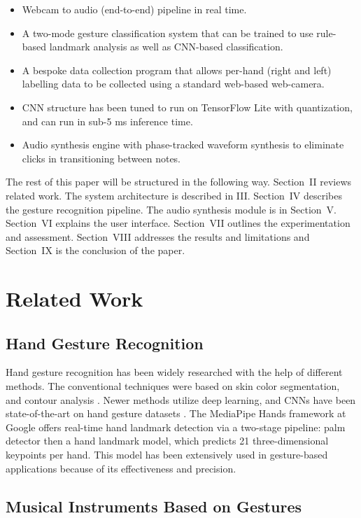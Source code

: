 \documentclass[conference]{IEEEtran}
\begin{document}
\begin{itemize}
\item Webcam to audio (end-to-end) pipeline in real time.
\item A two-mode gesture classification system that can be trained to use rule-based landmark analysis as well as CNN-based classification.
\item A bespoke data collection program that allows per-hand (right and left) labelling data to be collected using a standard web-based web-camera.
\item CNN structure has been tuned to run on TensorFlow Lite with quantization, and can run in sub-5 ms inference time.
\item Audio synthesis engine with phase-tracked waveform synthesis to eliminate clicks in transitioning between notes.
\end{itemize}

The rest of this paper will be structured in the following way. Section~II reviews related work. The system architecture is described in III. Section~IV describes the gesture recognition pipeline. The audio synthesis module is in Section~V. Section~VI explains the user interface. Section~VII outlines the experimentation and assessment. Section~VIII addresses the results and limitations and Section~IX is the conclusion of the paper.

\section{Related Work}

\subsection{Hand Gesture Recognition}

Hand gesture recognition has been widely researched with the help of different methods. The conventional techniques were based on skin color segmentation, and contour analysis \cite{pisharady2015recent}. Newer methods utilize deep learning, and CNNs have been state-of-the-art on hand gesture datasets \cite{molchanov2015hand}. The MediaPipe Hands framework at Google \cite{zhang2020mediapipe} offers real-time hand landmark detection via a two-stage pipeline: palm detector then a hand landmark model, which predicts 21 three-dimensional keypoints per hand. This model has been extensively used in gesture-based applications because of its effectiveness and precision.

\subsection{Musical Instruments Based on Gestures}
\end{document}
